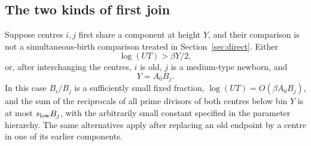 \subsection{The two kinds of first join}

\begin{lemma}
\label{join:classification}
Suppose centres $i,j$ first share a component at height $Y$, and their
comparison is not a simultaneous-birth comparison treated in
Section~\ref{sec:direct}. Either
\begin{equation}\label{join:distant}
 \log(UT)>\beta Y/2,
\end{equation}
or, after interchanging the centres, $i$ is old, $j$ is a medium-type
newborn, and
\begin{equation}\label{join:mixed}
 Y=A_0 B_j.
\end{equation}
In this case $B_i/B_j$ is a sufficiently small fixed fraction,
$\log(UT)=O(\beta A_0 B_j)$, and the sum of the
reciprocals of all prime divisors of both centres below bin $Y$ is at most
$s_{\rm low}B_j$, with the arbitrarily small constant specified in the
parameter hierarchy. The same alternatives apply after replacing an old
endpoint by a centre in one of its earlier components.
\end{lemma}


